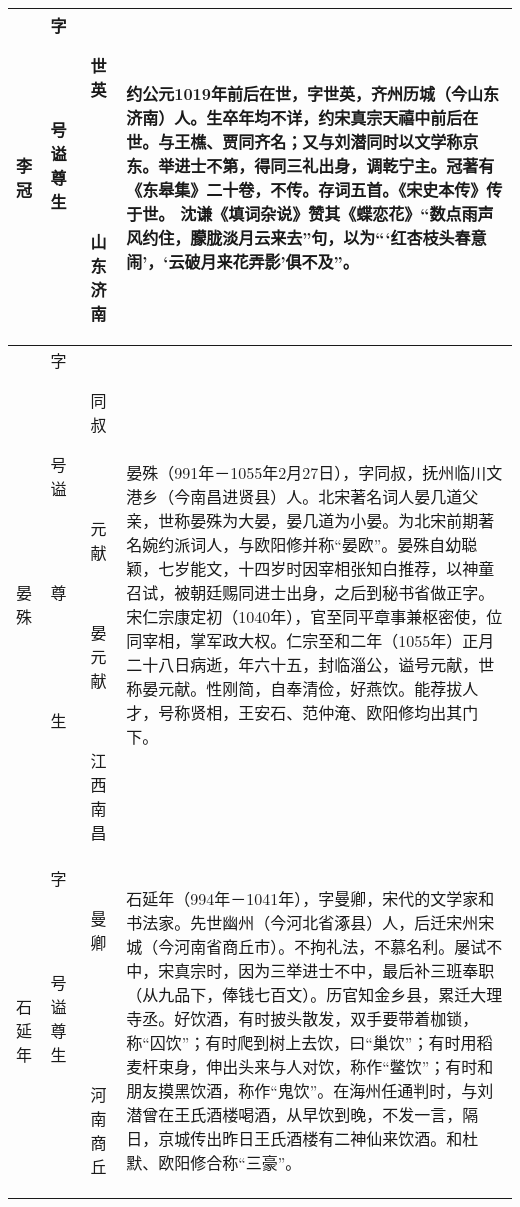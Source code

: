 \begin{longtable}{|>{\centering\namefont\heiti}m{2em}|>{\centering\tiny}m{3.0em}|>{\xzfont\kaiti}m{7em}|}
  李冠 & \begin{description}
  \item[字] 世英
  \item[号] 
  \item[谥] 
  \item[尊] 
  \item[生] 山东济南
  \end{description} & 约公元1019年前后在世，字世英，齐州历城（今山东济南）人。生卒年均不详，约宋真宗天禧中前后在世。与王樵、贾同齐名；又与刘潜同时以文学称京东。举进士不第，得同三礼出身，调乾宁主。冠著有《东皋集》二十卷，不传。存词五首。《宋史本传》传于世。 沈谦《填词杂说》赞其《蝶恋花》“数点雨声风约住，朦胧淡月云来去”句，以为“‘红杏枝头春意闹’，‘云破月来花弄影’俱不及”。 \tabularnewline\hline
  晏殊 & \begin{description}
  \item[字] 同叔
  \item[号] 
  \item[谥] 元献
  \item[尊] 晏元献
  \item[生] 江西南昌
  \end{description} & 晏殊（991年－1055年2月27日），字同叔，抚州临川文港乡（今南昌进贤县）人。北宋著名词人晏几道父亲，世称晏殊为大晏，晏几道为小晏。为北宋前期著名婉约派词人，与欧阳修并称“晏欧”。晏殊自幼聪颖，七岁能文，十四岁时因宰相张知白推荐，以神童召试，被朝廷赐同进士出身，之后到秘书省做正字。宋仁宗康定初（1040年），官至同平章事兼枢密使，位同宰相，掌军政大权。仁宗至和二年（1055年）正月二十八日病逝，年六十五，封临淄公，谥号元献，世称晏元献。性刚简，自奉清俭，好燕饮。能荐拔人才，号称贤相，王安石、范仲淹、欧阳修均出其门下。 \tabularnewline\hline
  石延年 & \begin{description}
  \item[字] 曼卿
  \item[号] 
  \item[谥] 
  \item[尊] 
  \item[生] 河南商丘
  \end{description} & 石延年（994年－1041年），字曼卿，宋代的文学家和书法家。先世幽州（今河北省涿县）人，后迁宋州宋城（今河南省商丘市）。不拘礼法，不慕名利。屡试不中，宋真宗时，因为三举进士不中，最后补三班奉职（从九品下，俸钱七百文）。历官知金乡县，累迁大理寺丞。好饮酒，有时披头散发，双手要带着枷锁，称“囚饮”；有时爬到树上去饮，曰“巢饮”；有时用稻麦杆束身，伸出头来与人对饮，称作“鳖饮”；有时和朋友摸黑饮酒，称作“鬼饮”。在海州任通判时，与刘潜曾在王氏酒楼喝酒，从早饮到晚，不发一言，隔日，京城传出昨日王氏酒楼有二神仙来饮酒。和杜默、欧阳修合称“三豪”。 \tabularnewline\hline

\end{longtable}

